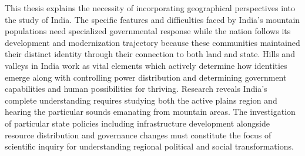 \vspace{0.3cm}

This thesis explains the necessity of incorporating geographical perspectives into the study of India. The specific features and difficulties faced by India's mountain populations need specialized governmental response while the nation follows its development and modernization trajectory because these communities maintained their distinct identity through their  connection to both land and state. Hills and valleys in India work as vital elements which actively determine how identities emerge along with controlling power distribution and determining government capabilities and human possibilities for thriving. Research reveals India's complete understanding requires studying both the active plains region and hearing the particular sounds emanating from mountain areas.  The investigation of particular state policies including infrastructure development alongside resource distribution and governance changes must constitute the focus of scientific inquiry for understanding regional political and social transformations.